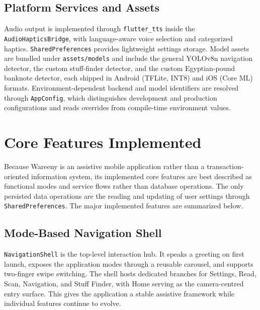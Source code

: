 \documentclass[12pt,a4paper]{report}
\begin{document}
\subsection{Platform Services and Assets}
Audio output is implemented through \texttt{flutter\_tts} inside the \texttt{AudioHapticsBridge}, with language-aware voice selection and categorized haptics. \texttt{SharedPreferences} provides lightweight settings storage. Model assets are bundled under \texttt{assets/models} and include the general YOLOv8n navigation detector, the custom stuff-finder detector, and the custom Egyptian-pound banknote detector, each shipped in Android (TFLite, INT8) and iOS (Core ML) formats. Environment-dependent backend and model identifiers are resolved through \texttt{AppConfig}, which distinguishes development and production configurations and reads overrides from compile-time environment values.

\section{Core Features Implemented}
Because Wareeny is an assistive mobile application rather than a transaction-oriented information system, its implemented core features are best described as functional modes and service flows rather than database operations. The only persisted data operations are the reading and updating of user settings through \texttt{SharedPreferences}. The major implemented features are summarized below.

\subsection{Mode-Based Navigation Shell}
\texttt{NavigationShell} is the top-level interaction hub. It speaks a greeting on first launch, exposes the application modes through a reusable carousel, and supports two-finger swipe switching. The shell hosts dedicated branches for Settings, Read, Scan, Navigation, and Stuff Finder, with Home serving as the camera-centred entry surface. This gives the application a stable assistive framework while individual features continue to evolve.
\end{document}
